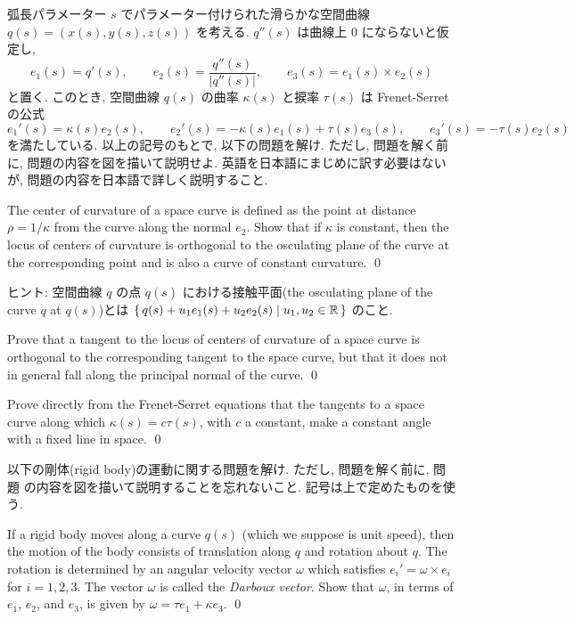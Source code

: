 \documentclass[12pt,twoside]{jarticle}
\begin{document}
弧長パラメーター $s$ でパラメーター付けられた滑らかな空間曲線 %
$q(s)=(x(s),y(s),z(s))$ を考える. $q''(s)$ は曲線上 $0$ にならないと仮定し,
\begin{equation*}
  e_1(s) = q'(s),
  \qquad
  e_2(s) = \frac{q''(s)}{|q''(s)|},
  \qquad
  e_3(s) = e_1(s) \times e_2(s)
\end{equation*}
と置く. このとき, 空間曲線 $q(s)$ の曲率 $\kappa(s)$ と捩率 $\tau(s)$ は 
Frenet-Serret の公式
\begin{equation*}
  e_1'(s) = \kappa(s) e_2(s),
  \qquad
  e_2'(s) = - \kappa(s) e_1(s) + \tau(s) e_3(s),
  \qquad
  e_3'(s) = - \tau(s) e_2(s)
\end{equation*}
を満たしている. 以上の記号のもとで, 以下の問題を解け. ただし, 問題を解く前に, 
問題の内容を図を描いて説明せよ. 英語を日本語にまじめに訳す必要はないが, 
問題の内容を日本語で詳しく説明すること.

\begin{question}
  The center of curvature of a space curve is defined as the point at
  distance $\rho=1/\kappa$ from the curve along the normal $e_2$. Show that
  if $\kappa$ is constant, then the locus of centers of curvature is
  orthogonal to the osculating plane of the curve at the corresponding point 
  and is also a curve of constant curvature.
  \qed
\end{question}

\noindent ヒント: 空間曲線 $q$ の点 $q(s)$ における接触平面(the osculating
plane of the curve $q$ at $q(s)$)とは %
$\{\,q(s)+u_1e_1(s)+u_2e_2(s)\mid u_1,u_2\in{\mathbb R}\,\}$ のこと.

\begin{question}
  Prove that a tangent to the locus of centers of curvature of a space curve
  is orthogonal to the corresponding tangent to the space curve, but that it
  does not in general fall along the principal normal of the curve.  \qed
\end{question}

\begin{question}
  Prove directly from the Frenet-Serret equations that the tangents to a
  space curve along which $\kappa(s) = c \tau(s)$, with $c$ a constant, make 
  a constant angle with a fixed line in space.
  \qed
\end{question}

以下の剛体(rigid body)の運動に関する問題を解け. ただし, 問題を解く前に, 問題
の内容を図を描いて説明することを忘れないこと. 記号は上で定めたものを使う.

\begin{question}
  If a rigid body moves along a curve $q(s)$ (which we suppose is unit
  speed), then the motion of the body consists of translation along $q$ and
  rotation about $q$.  The rotation is determined by an angular velocity
  vector $\omega$ which satisfies $e_i' = \omega\times e_i$ for $i=1,2,3$.
  The vector $\omega$ is called the {\em Darboux vector}.  Show that
  $\omega$, in terms of $e_1$, $e_2$, and $e_3$, is given by 
  $\omega=\tau e_1 + \kappa e_3$. 
  \qed
\end{question}
\end{document}
